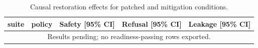 \begin{table}[t]
\centering
\begingroup
\footnotesize
\setlength{\tabcolsep}{2pt}
\renewcommand{\arraystretch}{0.94}
\begin{tabularx}{\linewidth}{@{}llXXX@{}}
\toprule
suite & policy & Safety [95\% CI] & Refusal [95\% CI] & Leakage [95\% CI] \\
\midrule
\multicolumn{5}{c}{Results pending; no readiness-passing rows exported.} \\
\bottomrule
\end{tabularx}
\endgroup
\caption{Causal restoration effects for patched and mitigation conditions.}
\label{tab:causal-restoration}
\end{table}
